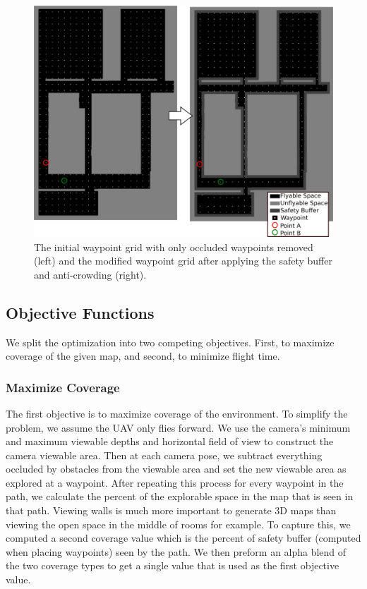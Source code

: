 \documentclass[letterpaper, 10 pt, conference]{ieeeconf}  %
\begin{document}
\begin{figure}
\centering
\includegraphics[width=0.8\linewidth]{figures/waypoint2.png}
\caption{The initial waypoint grid with only occluded waypoints removed (left) and the modified waypoint grid after applying the safety buffer and anti-crowding (right).}
\label{fig:waypoints}
\end{figure}

\subsection{Objective Functions}

We split the optimization into two competing objectives. First, to maximize coverage of the given map, and second, to minimize flight time.

\subsubsection{Maximize Coverage}

The first objective is to maximize coverage of the environment.  To simplify the problem, we assume the UAV only flies forward. We use the camera's minimum and maximum viewable depths and horizontal field of view to construct the camera viewable area. Then at each camera pose, we subtract everything occluded by obstacles from the viewable area and set the new viewable area as explored at a waypoint. After repeating this process for every waypoint in the path, we calculate the percent of the explorable space in the map that is seen in that path. Viewing walls is much more important to generate 3D maps than viewing the open space in the middle of rooms for example. To capture this, we computed a second coverage value which is the percent of safety buffer (computed when placing waypoints) seen by the path. We then preform an alpha blend of the two coverage types to get a single value that is used as the first objective value.
\end{document}
